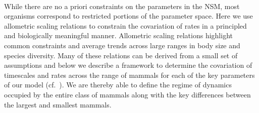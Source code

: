 \documentclass{pnastwo}
\begin{document}
\begin{article}
%



 \\ 
While there are no a priori constraints on the parameters in the NSM, most
organisms correspond to restricted portions of the parameter space.  Here we
use allometric scaling relations to constrain the covariation of rates in a
principled and biologically meaningful manner.  Allometric scaling relations
highlight common constraints and average trends across large ranges in body
size and species diversity. Many of these relations can be derived from a
small set of assumptions and below we describe a framework to determine the
covariation of timescales and rates across the range of mammals for each of
the key parameters of our model (cf.~\cite{Yodzis:1992hg}).  We are thereby
able to define the regime of dynamics occupied by the entire class of mammals
along with the key differences between the largest and smallest mammals.



\end{article}
\end{document}
